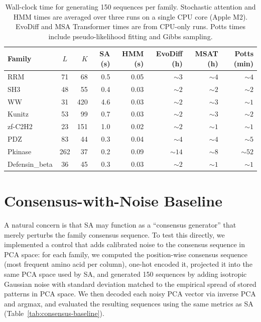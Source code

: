 \begin{table}[ht]
\centering
\small
\caption{Wall-clock time for generating 150 sequences per family. Stochastic attention and HMM times are averaged over three runs on a single CPU core (Apple M2). EvoDiff and MSA Transformer times are from CPU-only runs. Potts times include pseudo-likelihood fitting and Gibbs sampling.}
\label{tab:timing}
\begin{tabular}{@{}lcrrrrrr@{}}
\toprule
Family & $L$ & $K$ & SA (s) & HMM (s) & EvoDiff (h) & MSAT (h) & Potts (min) \\
\midrule
RRM            & 71  & 68  & 0.5  & 0.05 & ${\sim}3$   & ${\sim}4$   & ${\sim}4$ \\
SH3            & 48  & 55  & 0.4  & 0.03 & ${\sim}2$   & ${\sim}2$   & ${\sim}2$ \\
WW             & 31  & 420 & 4.6  & 0.03 & ${\sim}2$   & ${\sim}3$   & ${\sim}1$ \\
Kunitz         & 53  & 99  & 0.7  & 0.03 & ${\sim}2$   & ${\sim}3$   & ${\sim}2$ \\
zf-C2H2        & 23  & 151 & 1.0  & 0.02 & ${\sim}2$   & ${\sim}1$   & ${\sim}1$ \\
PDZ            & 83  & 44  & 0.3  & 0.04 & ${\sim}4$   & ${\sim}4$   & ${\sim}5$ \\
Pkinase        & 262 & 37  & 0.2  & 0.09 & ${\sim}14$  & ${\sim}8$   & ${\sim}52$ \\
Defensin\_beta & 36  & 45  & 0.3  & 0.03 & ${\sim}2$   & ${\sim}1$   & ${\sim}1$ \\
\bottomrule
\end{tabular}
\end{table}

\section{Consensus-with-Noise Baseline}\label{si:consensus-baseline}

A natural concern is that SA may function as a ``consensus generator'' that merely perturbs the family consensus sequence. To test this directly, we implemented a control that adds calibrated noise to the consensus sequence in PCA space: for each family, we computed the position-wise consensus sequence (most frequent amino acid per column), one-hot encoded it, projected it into the same PCA space used by SA, and generated 150 sequences by adding isotropic Gaussian noise with standard deviation matched to the empirical spread of stored patterns in PCA space. We then decoded each noisy PCA vector via inverse PCA and argmax, and evaluated the resulting sequences using the same metrics as SA (Table~\ref{tab:consensus-baseline}).

